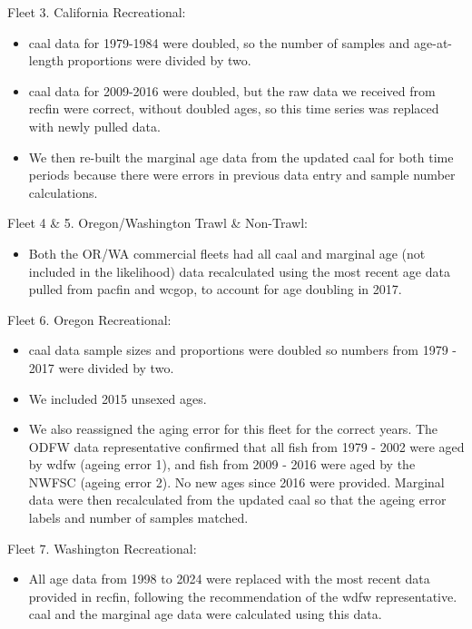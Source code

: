\documentclass[
  english,
]{article}
\providecommand{\tightlist}{%
  \setlength{\itemsep}{0pt}\setlength{\parskip}{0pt}}
\begin{document}
Fleet 3. California Recreational:

\begin{itemize}
\tightlist
\item
  \gls{caal} data for 1979-1984 were doubled, so the number of samples
  and age-at-length proportions were divided by two.
\item
  \gls{caal} data for 2009-2016 were doubled, but the raw data we
  received from \gls{recfin} were correct, without doubled ages, so this
  time series was replaced with newly pulled data.
\item
  We then re-built the marginal age data from the updated \gls{caal} for
  both time periods because there were errors in previous data entry and
  sample number calculations.
\end{itemize}

Fleet 4 \& 5. Oregon/Washington Trawl \& Non-Trawl:

\begin{itemize}
\tightlist
\item
  Both the OR/WA commercial fleets had all \gls{caal} and marginal age
  (not included in the likelihood) data recalculated using the most
  recent age data pulled from \gls{pacfin} and \gls{wcgop}, to account
  for age doubling in 2017.
\end{itemize}

Fleet 6. Oregon Recreational:

\begin{itemize}
\tightlist
\item
  \gls{caal} data sample sizes and proportions were doubled so numbers
  from 1979 - 2017 were divided by two.
\item
  We included 2015 unsexed ages.
\item
  We also reassigned the aging error for this fleet for the correct
  years. The ODFW data representative confirmed that all fish from 1979
  - 2002 were aged by \gls{wdfw} (ageing error 1), and fish from 2009 -
  2016 were aged by the NWFSC (ageing error 2). No new ages since 2016
  were provided. Marginal data were then recalculated from the updated
  \gls{caal} so that the ageing error labels and number of samples
  matched.
\end{itemize}

Fleet 7. Washington Recreational:

\begin{itemize}
\tightlist
\item
  All age data from 1998 to 2024 were replaced with the most recent data
  provided in \gls{recfin}, following the recommendation of the
  \gls{wdfw} representative. \gls{caal} and the marginal age data were
  calculated using this data.
\end{itemize}
\end{document}
